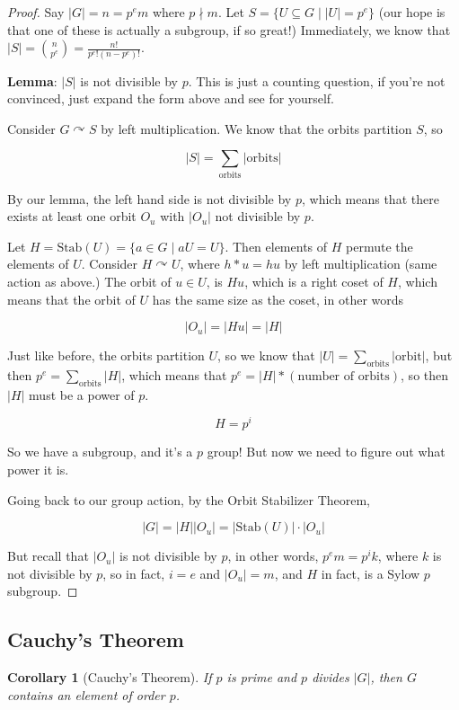 \documentclass[12pt]{article}
\def\Stab{\text{Stab}}
\def\acts{\curvearrowright} %
\newtheorem{corollary}{Corollary}
\theoremstyle{remark}
\theoremstyle{remark}
\theoremstyle{remark}
\theoremstyle{remark}
\theoremstyle{remark}
\begin{document}
\begin{proof}
  Say $|G| = n = p^e m$ where $p \nmid m$. Let $S = \{U \subseteq G \mid |U| =
  p^e \}$ (our hope is that one of these is actually a subgroup, if so great!)
  Immediately, we know that $|S| = \binom{n}{p^e} = \frac{n!}{p^e! (n - p^e)!}$.

  {\bf Lemma}: $|S|$ is not divisible by $p$. This is just a counting question, if
  you're not convinced, just expand the form above and see for yourself.

  Consider $G \acts S$ by left multiplication. We know that the orbits partition
  $S$, so

  \[
    |S| = \sum_{\text{orbits}} |\text{orbits}|
  \]

  By our lemma, the left hand side is not divisible by $p$, which means that there
  exists at least one orbit $O_u$ with $|O_u|$ not divisible by $p$.

  Let $H = \Stab(U) = \{a \in G \mid aU = U\}$. Then elements of $H$ permute the
  elements of $U$. Consider $H \acts U$, where $h * u = hu$ by left multiplication
  (same action as above.) The orbit of $u \in U$, is $Hu$, which is a right coset
  of $H$, which means that the orbit of $U$ has the same size as the coset, in
  other words

  \[
    |O_u| = |Hu| = |H|
  \]

  Just like before, the orbits partition $U$, so we know that $|U| =
  \sum_{\text{orbits}} |\text{orbit}|$, but then $p^e = \sum_{\text{orbits}}
  |H|$, which means that $p^e = |H| * (\text{number of orbits})$, so then $|H|$
  must be a power of $p$.

  \[
    H = p^i
  \]

  So we have a subgroup, and it's a $p$ group! But now we need to figure out what
  power it is.

  Going back to our group action, by the Orbit Stabilizer Theorem,

  \[
    |G| = |H| |O_u| = |\Stab(U)| \cdot |O_u|
  \]

  But recall that $|O_u|$ is not divisible by $p$, in other words, $p^em = p^i k$,
  where $k$ is not divisible by $p$, so in fact, $i = e$ and $|O_u| = m$, and $H$
  in fact, is a Sylow $p$ subgroup.
\end{proof}

\subsection{Cauchy's Theorem}
\begin{corollary}[Cauchy's Theorem]
  If $p$ is prime and $p$ divides $|G|$, then $G$ contains an element of order $p$.
\end{corollary}
\end{document}
